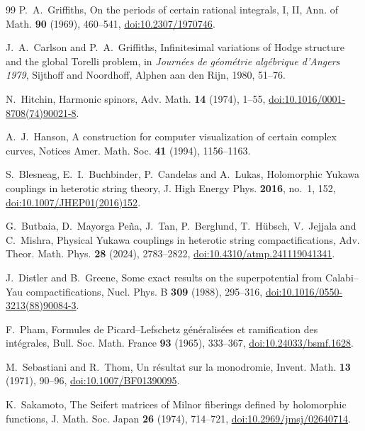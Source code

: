 \documentclass[11pt]{amsart}
\theoremstyle{definition}
\theoremstyle{remark}
\begin{document}
\begin{thebibliography}{99}
P.~A.~Griffiths, On the periods of certain rational integrals, I, II, Ann.
of Math. \textbf{90} (1969), 460--541,
\href{https://doi.org/10.2307/1970746}{doi:10.2307/1970746}.

J.~A.~Carlson and P.~A.~Griffiths, Infinitesimal variations of Hodge
structure and the global Torelli problem, in \emph{Journ\'ees de
g\'eom\'etrie alg\'ebrique d'Angers 1979}, Sijthoff and Noordhoff, Alphen
aan den Rijn, 1980, 51--76.

N.~Hitchin, Harmonic spinors, Adv. Math. \textbf{14} (1974), 1--55,
\href{https://doi.org/10.1016/0001-8708(74)90021-8}{doi:10.1016/0001-8708(74)90021-8}.

A.~J.~Hanson, A construction for computer visualization of certain complex
curves, Notices Amer. Math. Soc. \textbf{41} (1994), 1156--1163.

S.~Blesneag, E.~I.~Buchbinder, P.~Candelas and A.~Lukas, Holomorphic Yukawa
couplings in heterotic string theory, J. High Energy Phys. \textbf{2016},
no.~1, 152,
\href{https://doi.org/10.1007/JHEP01(2016)152}{doi:10.1007/JHEP01(2016)152}.

G.~Butbaia, D.~Mayorga Pe\~na, J.~Tan, P.~Berglund, T.~H\"ubsch, V.~Jejjala
and C.~Mishra, Physical Yukawa couplings in heterotic string
compactifications, Adv. Theor. Math. Phys. \textbf{28} (2024), 2783--2822,
\href{https://doi.org/10.4310/atmp.241119041341}{doi:10.4310/atmp.241119041341}.

J.~Distler and B.~Greene, Some exact results on the superpotential from
Calabi--Yau compactifications, Nucl. Phys. B \textbf{309} (1988), 295--316,
\href{https://doi.org/10.1016/0550-3213(88)90084-3}{doi:10.1016/0550-3213(88)90084-3}.

F.~Pham, Formules de Picard--Lefschetz g\'en\'eralis\'ees et ramification
des int\'egrales, Bull. Soc. Math. France \textbf{93} (1965), 333--367,
\href{https://doi.org/10.24033/bsmf.1628}{doi:10.24033/bsmf.1628}.

M.~Sebastiani and R.~Thom, Un r\'esultat sur la monodromie, Invent. Math.
\textbf{13} (1971), 90--96,
\href{https://doi.org/10.1007/BF01390095}{doi:10.1007/BF01390095}.

K.~Sakamoto, The Seifert matrices of Milnor fiberings defined by holomorphic
functions, J. Math. Soc. Japan \textbf{26} (1974), 714--721,
\href{https://doi.org/10.2969/jmsj/02640714}{doi:10.2969/jmsj/02640714}.


\end{thebibliography}
\end{document}
